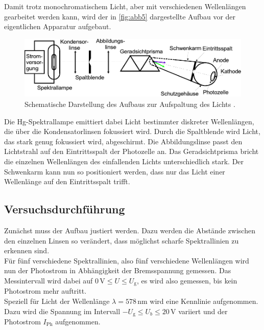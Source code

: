 Damit trotz monochromatischem Licht, aber mit verschiedenen Wellenlängen gearbeitet werden kann, wird der in \autoref{fig:abb5} dargestellte Aufbau vor der eigentlichen Apparatur aufgebaut.

\begin{figure}[H]
    \centering
    \includegraphics{figures/Abb5.pdf}
    \caption{Schematische Darstellung des Aufbaus zur Aufspaltung des Lichts \cite{ap10}.}
    \label{fig:abb5}
\end{figure}

Die Hg-Spektrallampe emittiert dabei Licht bestimmter diskreter Wellenlängen, die über die Kondensatorlinsen fokussiert wird.
Durch die Spaltblende wird Licht, das stark genug fokussiert wird, abgeschirmt. Die Abbildungslinse passt den Lichtstrahl auf den Eintrittsspalt der Photozelle an.
Das Geradsichtprisma bricht die einzelnen Wellenlängen des einfallenden Lichts unterschiedlich stark.
Der Schwenkarm kann nun so positioniert werden, dass nur das Licht einer Wellenlänge auf den Eintrittsspalt trifft. \\

\subsection{Versuchsdurchführung}

Zunächst muss der Aufbau justiert werden.
Dazu werden die Abstände zwischen den einzelnen Linsen so verändert, dass möglichst scharfe Spektrallinien zu erkennen sind. \\

Für fünf verschiedene Spektrallinien, also fünf verschiedene Wellenlängen wird nun der Photostrom in Abhängigkeit der Bremsspannung gemessen.
Das Messintervall wird dabei auf $0 \,\unit{\volt} \leq U \leq U_\text{g}$, es wird also gemessen, bis kein Photostrom mehr auftritt. \\

Speziell für Licht der Wellenlänge $\lambda = 578 \, \unit{\nano\meter}$ wird eine Kennlinie aufgenommen.
Dazu wird die Spannung im Intervall $-U_\text{g} \leq U_b \leq 20 \,\unit{\volt}$ variiert und der Photostrom $I_\text{Ph}$ aufgenommen.

